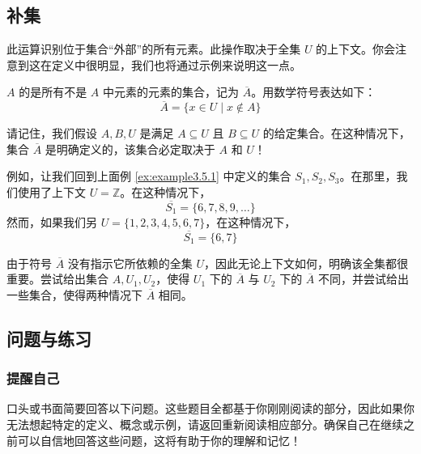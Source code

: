 \subsection{补集}

此运算识别位于集合``外部''的所有元素。此操作取决于全集 $U$ 的上下文。你会注意到这在定义中很明显，我们也将通过示例来说明这一点。

\begin{definition}
    $A$ 的是所有不是 $A$ 中元素的元素的集合，记为 $\overline{A}$。用数学符号表达如下：
    \[\overline{A} = \{x \in U \mid x \notin A\}\]
\end{definition}

请记住，我们假设 $A,B,U$ 是满足 $A \subseteq U$ 且 $B \subseteq U$ 的给定集合。在这种情况下，集合 $\overline{A}$ 是明确定义的，该集合必定取决于 $A$ 和 $U$！\\

\begin{example}
    例如，让我们回到上面例 \ref{ex:example3.5.1} 中定义的集合 $S_1, S_2, S_3$。在那里，我们使用了上下文 $U = \mathbb{Z}$。在这种情况下，
    \[\overline{S_1} = \{6, 7, 8, 9, \dots \}\]
    然而，如果我们另 $U = \{1, 2, 3, 4, 5, 6, 7\}$，在这种情况下，
    \[\overline{S_1} = \{6, 7\}\]
\end{example}

由于符号 $\overline{A}$ 没有指示它所依赖的全集 $U$，因此无论上下文如何，明确该全集都很重要。尝试给出集合 $A, U_1, U_2$，使得 $U_1$ 下的 $\overline{A}$ 与 $U_2$ 下的 $\overline{A}$ 不同，并尝试给出一些集合，使得两种情况下 $\overline{A}$ 相同。

\subsection{问题与练习}

\subsubsection*{提醒自己}

口头或书面简要回答以下问题。这些题目全都基于你刚刚阅读的部分，因此如果你无法想起特定的定义、概念或示例，请返回重新阅读相应部分。确保自己在继续之前可以自信地回答这些问题，这将有助于你的理解和记忆！

